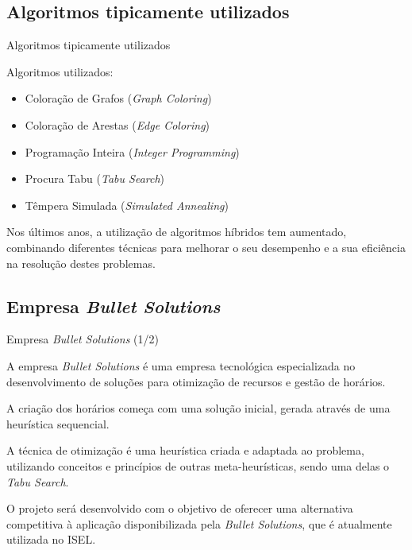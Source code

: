 \documentclass[aspectratio=169]{beamer}
\begin{document}
    \subsection{Algoritmos tipicamente utilizados}

    \begin{frame}{Algoritmos tipicamente utilizados}
        \justifying

        Algoritmos utilizados:
        \begin{itemize}
            \item Coloração de Grafos (\textit{Graph Coloring})
            \item Coloração de Arestas (\textit{Edge Coloring})
            \item Programação Inteira (\textit{Integer Programming})
            \item Procura Tabu (\textit{Tabu Search})
            \item Têmpera Simulada (\textit{Simulated Annealing})
        \end{itemize}

        \vfill

        Nos últimos anos, a utilização de algoritmos híbridos tem aumentado, combinando diferentes técnicas para melhorar o seu desempenho e a sua eficiência na resolução destes problemas.
    \end{frame}

    \subsection{Empresa \textit{Bullet Solutions}}

    \begin{frame}{Empresa \textit{Bullet Solutions} (1/2)}
        \justifying

        A empresa \textit{Bullet Solutions} é uma empresa tecnológica especializada no desenvolvimento de soluções para otimização de recursos e gestão de horários.

        \vfill

        A criação dos horários começa com uma solução inicial, gerada através de uma heurística sequencial.

        \vfill

        A técnica de otimização é uma heurística criada e adaptada ao problema, utilizando conceitos e princípios de outras meta-heurísticas, sendo uma delas o \textit{Tabu Search}.

        \vfill

        O projeto será desenvolvido com o objetivo de oferecer uma alternativa competitiva à aplicação disponibilizada pela \textit{Bullet Solutions}, que é atualmente utilizada no ISEL.
    \end{frame}
\end{document}
